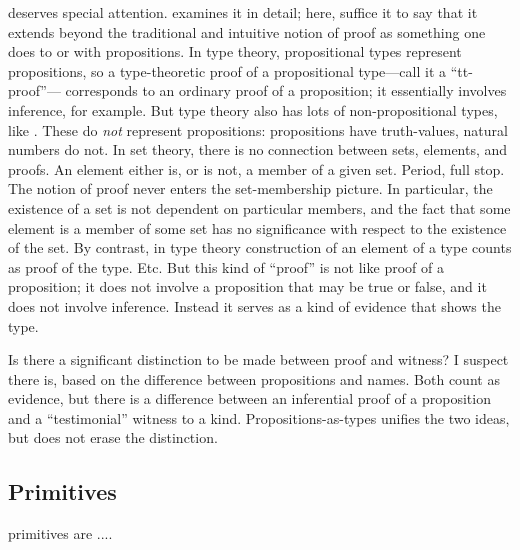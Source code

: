 deserves special
attention.   examines it in detail; here, suffice it
to say that it extends beyond the traditional and intuitive notion of
proof as something one does to or with propositions.  In type theory,
propositional types represent propositions, so a type-theoretic proof
of a propositional type---call it a ``tt-proof''--- corresponds to an
ordinary proof of a proposition; it essentially involves inference,
for example.  But type theory also has lots of non-propositional
types, like \N.  These do \textit{not} represent propositions:
propositions have truth-values, natural numbers do not.  In set
theory, there is no connection between sets, elements, and proofs.  An
element either is, or is not, a member of a given set.  Period, full
stop.  The notion of proof never enters the set-membership
picture.
In particular, the existence of a set is not dependent on particular
members, and the fact that some element is a member of some set has no
significance with respect to the existence of the set.  By contrast,
in type theory construction of an element of a type counts as proof of
the type.  Etc.  But this kind of
``proof'' is not like proof of a proposition; it does not involve a
proposition that may be true or false, and it does not involve
inference.  Instead it serves as a kind of evidence that shows the
type.

\begin{remark}
  Is there a significant distinction to be made between proof and
  witness?  I suspect there is, based on the difference between
  propositions and names.  Both count as evidence, but there is a
  difference between an inferential proof of a proposition and a
  ``testimonial'' witness to a kind.  Propositions-as-types unifies
  the two ideas, but does not erase the distinction.
\end{remark}

\subsection{\HoTT Primitives}
\label{subs:hottprimitives}

\HoTT primitives are ....

